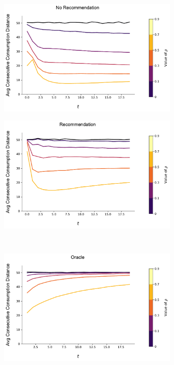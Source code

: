 \documentclass[format=acmsmall, review=false]{acmart}
\begin{document}
\begin{figure}[t]
\begin{subfigure}{.45\textwidth}
\includegraphics[width=\linewidth]{figures/rho_consumption_dist_N_200T_20.pdf}
\end{subfigure}
\begin{subfigure}{.45\textwidth}
\includegraphics[width=\linewidth]{figures/rho_consumption_dist_N_200T_20_partial.pdf}
\end{subfigure}\\
\begin{subfigure}{.45\textwidth}
\includegraphics[width=\linewidth]{figures/rho_consumption_dist_N_200T_20_omni.pdf}\\

\end{subfigure}
\end{figure}
\end{document}

